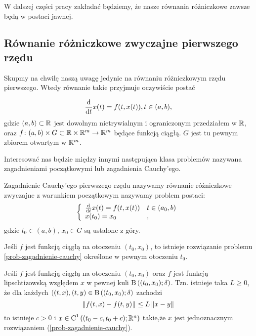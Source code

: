 \documentclass[12pt,a4paper]{report}
\begin{document}
W dalszej części pracy zakładać będziemy, że nasze równania różniczkowe zawsze będą w postaci jawnej.


\subsection{Równanie różniczkowe zwyczajne pierwszego rzędu}

Skupmy na chwilę naszą uwagę jedynie na równaniu różniczkowym rzędu pierwszego. Wtedy równanie takie przyjmuje oczywiście postać 

$$
\frac{\mathrm{d} {} }{\mathrm{d}{t}}x(t) = f(t,x(t)), t \in (a,b) ,
$$ 
gdzie $(a,b) \subset \mathbb{R}$ jest dowolnym nietrywialnym i ograniczonym przedziałem w $\mathbb{R}$, oraz $ f \colon (a,b) \times G \subset \mathbb{R} \times \mathbb{R}^m \to \mathbb{R}^m$ będące funkcją ciągłą. $G$ jest tu pewnym zbiorem otwartym w $\mathbb{R}^m$. 

Interesować nas będzie między innymi następująca klasa problemów nazywana zagadnieniami początkowymi lub zagadnienia Cauchy'ego.

\begin{problem} \label{prob-zagadnienie-cauchy}
Zagadnienie Cauchy'ego pierwszego rzędu nazywamy równanie różniczkowe zwyczajne z warunkiem początkowym nazywamy problem postaci:
\begin{equation} 
\left\{\begin{array}{ll}
\frac{\mathrm{d} {} }{\mathrm{d}{t}} x(t) = f(t,x(t)) & t \in (a_0,b) \\
x(t_0) = x_0 &,
\end{array} \right.
\end{equation}
gdzie $t_0 \in (a,b)$, $x_0 \in G$ są ustalone z góry. 
\end{problem}

\begin{theorem}
Jeśli $f$ jest funkcją ciągłą na otoczeniu $(t_{0},x_{0})$, to istnieje rozwiązanie problemu \ref{prob-zagadnienie-cauchy} określone w pewnym otoczeniu $t_{0}$. 
\end{theorem}

\begin{theorem}
Jeśli $f$ jest funkcją ciągłą na otoczeniu $(t_{0},x_{0})$ oraz $f$ jest funkcją lipschtizowską względem $x$ w pewnej kuli $\ball{(t_0,x_0)}{\delta}$. Tzn.
 istnieje taka $L\geq 0$, że dla każdych $((t,x),(t,y) \in \ball{(t_0,x_0)}{\delta} $ zachodzi
$$
  \left\| {f(t,x) - f(t,y)} \right\|_{} \leq L \left\| { x-y} \right\|_{} 
$$
 to istnieje $ c> 0 $ i $x \in \Ck{1}{(t_0-c,t_0+c); \setR^{n} }  $ takie,że $x$ jest jednoznacznym rozwiązaniem (\ref{prob-zagadnienie-cauchy}).
\end{theorem}
\end{document}
